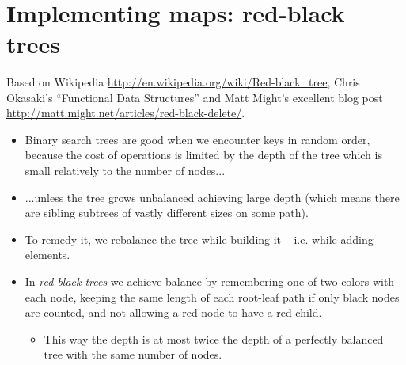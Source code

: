\documentclass{beamer}
\newcommand{\tmem}[1]{{\em #1\/}}
\begin{document}
{{{\hlstd{ \ \ \ \ \ }}{\hlopt{\textbar }}{}{\hlopt{->
}}{}{}{\hlendline{}}\\
{\hlstd{ \ \ \ \ \ }}{\hlopt{\textbar }}{}{\hlopt{(}}{\hlstd{{\textunderscore}}}{\hlopt{, }}{}{\hlopt{,
}}{}{\hlopt{, }}{\hlstd{{\textunderscore}}}{\hlopt{) }}{}{}{\hlopt{= }}{}{\hlopt{-> }}{}{\hlopt{\textbar }}{}{\hlopt{(}}{}{\hlopt{,
}}{}{\hlopt{, }}{\hlstd{{\textunderscore}}}{\hlopt{,
}}{\hlstd{{\textunderscore}}}{\hlopt{) }}{}{}{\hlopt{<
}}{}{\hlopt{-> }}{}{\hlopt{\textbar }}{}{\hlopt{(}}{\hlstd{{\textunderscore}}}{\hlopt{,
}}{\hlstd{{\textunderscore}}}{\hlopt{, }}{\hlstd{{\textunderscore}}}{\hlopt{,
}}{}{\hlopt{) -> }}{}{\hlendline{}}\\
{}{\hlendline{}}\\
}}

\section{Implementing maps: red-black trees}

Based on Wikipedia
\href{http://en.wikipedia.org/wiki/Red-black_tree}{http://en.wikipedia.org/wiki/Red-black\_tree},
Chris Okasaki's ``Functional Data Structures'' and Matt Might's excellent blog
post
\href{http://matt.might.net/articles/red-black-delete/}{http://matt.might.net/articles/red-black-delete/}.
\begin{itemize}
  \item Binary search trees are good when we encounter keys in random order,
  because the cost of operations is limited by the depth of the tree which is
  small relatively to the number of nodes...
  
  \item ...unless the tree grows unbalanced achieving large depth (which means
  there are sibling subtrees of vastly different sizes on some path).
  
  \item To remedy it, we rebalance the tree while building it -- i.e. while
  adding elements.
  
  \item In {\tmem{red-black trees}} we achieve balance by remembering one of
  two colors with each node, keeping the same length of each root-leaf path if
  only black nodes are counted, and not allowing a red node to have a red
  child.
  \begin{itemize}
    \item This way the depth is at most twice the depth of a perfectly
    balanced tree with the same number of nodes.
  \end{itemize}
\end{itemize}
\end{document}
